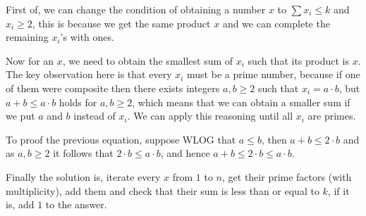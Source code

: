 First of, we can change the condition of obtaining a number $x$ to $\sum x_i
\le k$ and $x_i \ge 2$, this is because we get the same product $x$ and we can
complete the remaining $x_i$'s with ones.

Now for an $x$, we need to obtain the smallest sum of $x_i$ such that its
product is $x$. The key observation here is that every $x_i$ must be a prime
number, because if one of them were composite then there exists integers $a, b
\ge 2$ such that $x_i = a \cdot b$, but $a + b \le a \cdot b$ holds for $a, b
\ge 2$, which means that we can obtain a smaller sum if we put $a$ and $b$
instead of $x_i$. We can apply this reasoning until all $x_i$ are primes.

To proof the previous equation, suppose WLOG that $a \le b$, then $a + b \le 2
\cdot b$ and as $a, b \ge 2$ it follows that $2 \cdot b \le a \cdot b$, and
hence $a + b \le 2 \cdot b \le a \cdot b$.

Finally the solution is, iterate every $x$ from $1$ to $n$, get their prime
factors (with multiplicity), add them and check that their sum is less than or
equal to $k$, if it is, add $1$ to the answer.
